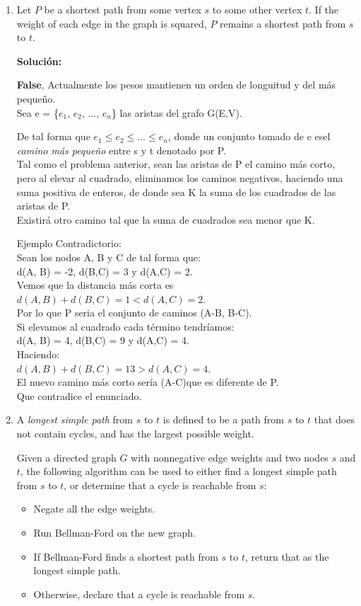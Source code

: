 \documentclass{article}
\begin{document}
\begin{enumerate}
  \item Let $P$ be a shortest path from some vertex
    $s$ to some other vertex $t$.  If the weight of each edge in the
    graph is squared, $P$ remains a shortest path from $s$ to $t$.
  
  \textbf{Solución:}
  
  \textbf{False}, Actualmente los pesos mantienen un orden de longuitud y del más pequeño.\\
  Sea e = \{$e_1$, $e_2$, ..., $e_n$\} las aristas del grafo G(E,V).
  
  De tal forma que $e_1 \leq e_2 \leq ...\leq e_n$, donde un conjunto tomado de e esel \textit{camino más pequeño} entre s y t denotado por P.\\
  Tal como el problema anterior, sean las aristas de P el camino más corto, pero al elevar al cuadrado, eliminamos los caminos negativos, haciendo una suma positiva de enteros, de donde sea K la suma de los cuadrados de las aristas de P.\\
  Existirá otro camino tal que la suma de cuadrados sea menor que K.
  
  Ejemplo Contradictorio:\\
  Sean los nodos A, B y C de tal forma que:\\
  d(A, B) = -2, d(B,C) = 3 y d(A,C) = 2.\\
  Vemos que la distancia más corta es $d(A,B) + d(B,C) = 1 < d(A,C) = 2$.\\
  Por lo que P seria el conjunto de caminos (A-B, B-C).\\
  Si elevamos al cuadrado cada término tendríamos:\\
  d(A, B) = 4, d(B,C) = 9 y d(A,C) = 4.\\
  Haciendo:\\
  $d(A,B) + d(B,C) = 13 > d(A,C) = 4$.\\
  El nuevo camino más corto sería (A-C)que es diferente de P.\\
  Que contradice el enunciado.

  \item A \emph{longest simple path} from $s$ to $t$
    is defined to be a path from $s$ to $t$ that does not contain
    cycles, and has the largest possible weight.

    Given a directed graph $G$ with nonnegative edge weights and two
    nodes $s$ and $t$, the following algorithm can be used to either
    find a longest simple path from $s$ to $t$, or determine that a
    cycle is reachable from $s$:
    \begin{itemize}
    \item Negate all the edge weights.
    \item Run Bellman-Ford on the new graph.
    \item If Bellman-Ford finds a shortest path from $s$ to $t$,
    return that as the longest simple path.
    \item Otherwise, declare that a cycle is reachable from $s$.
    \end{itemize}


\end{enumerate}
\end{document}
